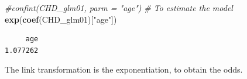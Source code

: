 \documentclass[
]{article}
\newenvironment{Shaded}{\begin{snugshade}}{\end{snugshade}}
\newcommand{\CommentTok}[1]{\textcolor[rgb]{0.56,0.35,0.01}{\textit{#1}}}
\newcommand{\KeywordTok}[1]{\textcolor[rgb]{0.13,0.29,0.53}{\textbf{#1}}}
\newcommand{\NormalTok}[1]{#1}
\newcommand{\StringTok}[1]{\textcolor[rgb]{0.31,0.60,0.02}{#1}}
\begin{document}
\begin{Shaded}
\begin{Highlighting}[]
\CommentTok{#confint(CHD_glm01, parm = "age")}
\CommentTok{# To estimate the model}
\KeywordTok{exp}\NormalTok{(}\KeywordTok{coef}\NormalTok{(CHD_glm01)[}\StringTok{"age"}\NormalTok{])}
\end{Highlighting}
\end{Shaded}

\begin{verbatim}
     age 
1.077262 
\end{verbatim}

The link transformation is the exponentiation, to obtain the odds.
\end{document}
